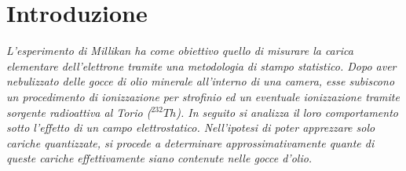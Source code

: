 \section{Introduzione}
\textit{L'esperimento di Millikan ha come obiettivo quello di misurare la carica elementare dell'elettrone tramite una metodologia di stampo statistico.
Dopo aver nebulizzato delle gocce di olio minerale all'interno di una camera, esse subiscono un procedimento di ionizzazione per strofinio ed un eventuale ionizzazione tramite sorgente radioattiva al Torio (\textit{$^{232}Th$}). In seguito si analizza il loro comportamento sotto l'effetto di un campo elettrostatico.
Nell'ipotesi di poter apprezzare solo cariche quantizzate, si procede a determinare approssimativamente quante di queste cariche effettivamente siano contenute nelle gocce d'olio.}